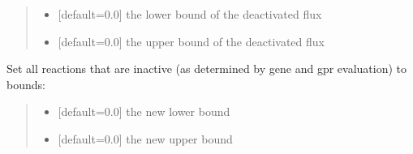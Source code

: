 \documentclass[letterpaper,12pt,english]{sphinxmanual}
\begin{document}
\begin{fulllineitems}
\begin{fulllineitems}
\begin{quote}
\begin{description}
\begin{itemize}
\item {} 
\sphinxAtStartPar
{} \textendash{} {[}default=0.0{]} the lower bound of the deactivated flux

\item {} 
\sphinxAtStartPar
{} \textendash{} {[}default=0.0{]} the upper bound of the deactivated flux

\end{itemize}

\end{description}\end{quote}

\end{fulllineitems}


\begin{fulllineitems}
\label{\detokenize{api/core:cbmpy.CBModel.Model.setAllInactiveGPRBounds}}
\pysigstartsignatures
\pysiglinewithargsret
{}
{\sphinxparamcomma {}}
{}
\pysigstopsignatures
\sphinxAtStartPar
Set all reactions that are inactive (as determined by gene and gpr evaluation) to bounds:
\begin{quote}\begin{description}
\begin{itemize}
\item {} 
\sphinxAtStartPar
{} \textendash{} {[}default=0.0{]} the new lower bound

\item {} 
\sphinxAtStartPar
{} \textendash{} {[}default=0.0{]} the new upper bound

\end{itemize}

\end{description}\end{quote}

\end{fulllineitems}



\end{fulllineitems}
\end{document}
